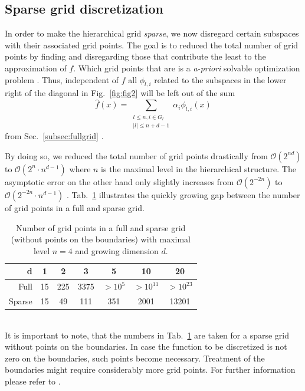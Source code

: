 \subsection{Sparse grid discretization}
In order to make the hierarchical grid \emph{sparse}, we now disregard certain
subspaces with their associated  grid points. The goal is to reduced the total
number of grid points by finding and disregarding those that contribute the
least to the approximation of $f$.
Which grid points that are is a \emph{a-priori}
solvable optimization problem \cite{disspfl}. 
Thus, independent of $f$ all $\phi_{l,i}$
related to the subspaces in the
lower right of the diagonal in Fig.~\ref{fig:fig2} will be left out of the sum
$$\hat{f}(x) =  \sum_{\substack{l \leq n, i \in G_l\\
    |l| \leq n + d - 1}}{\alpha_i\phi_{l,i}(x)}$$
from Sec.~\ref{subsec:fullgrid} \cite{disspfl, artbunshort}.
\par
By doing so, we reduced the total number of grid points drastically
from $\mathcal{O}(2^{nd})$ to $\mathcal{O}(2^{n} \cdot n^{d-1})$ where $n$ is
the maximal level in the hierarchical structure. The asymptotic error on the
other hand only slightly increases from $\mathcal{O}(2^{-2n})$ to
\mbox{$\mathcal{O}(2^{-2n} \cdot n^{d-1})$} \cite{disspfl}. Tab.~\ref{tab:tab1}
illustrates the quickly
growing gap between the number of grid points in a full and sparse grid.
\begin{table}[h]
  \centering
  \begin{tabular}{r | c | c | c | c | c | c}
    d & 1 & 2 & 3 & 5 & 10 & 20 \\
    \hline\hline
    Full & 15 &  225 & 3375 & $>10^5$ & $> 10^{11}$ & $> 10^{23}$ \\
    \hline
    Sparse & 15 & 49 & 111 & 351 & 2001 & 13201 \\
  \end{tabular}
  \captionsetup{width=0.44\textwidth}
  \caption{Number of grid points in a full and sparse grid
    (without points on the boundaries)
    with maximal level $n = 4$ and growing dimension $d$.\label{tab:tab1}}
\end{table}\\
It is important to note, that the numbers in Tab.~\ref{tab:tab1} are taken
for a sparse grid without points on the boundaries. In case the function
to be discretized is not zero on the boundaries, such points become necessary.
Treatment of the boundaries might require considerably
more grid points. For further information please refer to
\cite{disspfl, disspeh}.

